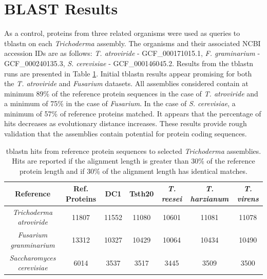 \section{BLAST Results}
\label{section:blast}

As a control, proteins from three related organisms were used as
queries to tblastn\cite{Altschul1990} on each \textit{Trichoderma}
assembly. The organisms and their associated NCBI accession IDs are as
follows: \textit{T. atroviride} - GCF\_000171015.1,
\textit{F. graminarium} - GCF\_000240135.3, \textit{S. cerevisiae} -
GCF\_000146045.2.  Results from the tblastn runs are presented in
Table \ref{table:tblastn-prots}. Initial tblastn results appear
promising for both the \textit{T. atroviride} and \textit{Fusarium}
datasets. All assemblies considered contain at minimum 89\% of the
reference protein sequences in the case of \textit{T. atroviride} and
a minimum of 75\% in the case of \textit{Fusarium}. In the case of
\textit{S. cerevisiae}, a minimum of 57\% of reference proteins
matched. It appears that the percentage of hits decreases as
evolutionary distance increases. These results provide rough
validation that the assemblies contain potential for protein coding
sequences.


\begin{table}
  \centering
  \begin{tabular}{|c|c|c|c|c|c|c|}
    \hline
    Reference & Ref. Proteins & DC1 & Tsth20 & \textit{T. reesei} & \textit{T. harzianum} & \textit{T. virens}  \\ \hline
    \textit{Trichoderma atroviride} & 11807 & 11552 & 11080 & 10601 & 11081 & 11078 \\ \hline 
    \textit{Fusarium granminarium} & 13312 & 10327 & 10429 & 10064 & 10434 & 10490 \\ \hline
    \textit{Saccharomyces cerevisiae} & 6014 & 3537 & 3517 & 3445 & 3509 & 3500 \\ \hline
  \end{tabular}
  \caption{tblastn hits from reference protein sequences to selected
    \textit{Trichoderma} assemblies. Hits are reported if the
    alignment length is greater than 30\% of the reference protein
    length and if 30\% of the alignment length has identical
    matches.}
  \label{table:tblastn-prots}
\end{table}

